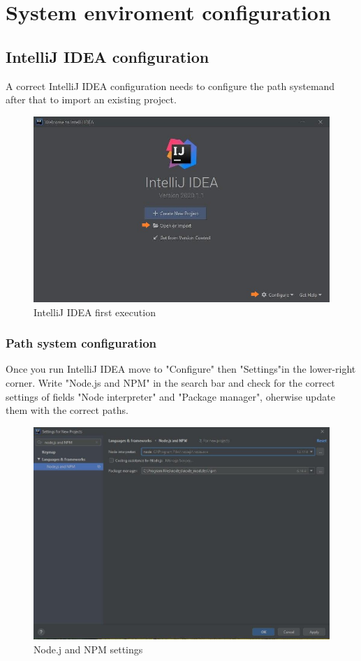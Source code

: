 \section{System enviroment configuration}
	\subsection{IntelliJ IDEA configuration}
A correct IntelliJ IDEA configuration needs to configure the path system\glo and after that to import an existing project.
	
	\begin{figure}[H]
		\centering
		\includegraphics[scale=0.70]{../Developer_manual/img/intellijidea_main.jpg}
		\caption{IntelliJ IDEA first execution}
	\end{figure}	

	

	\subsubsection{Path system configuration}
Once you run IntelliJ IDEA move to "Configure" then "Settings"in the lower-right corner. Write "Node.js and NPM" in the search bar and check for the correct settings of fields "Node interpreter" and "Package manager", oherwise update them with the correct paths. 

\begin{figure}[H]
		\centering
		\includegraphics[scale=0.60]{../Developer_manual/img/nodejs_and_npm.jpg}
		\caption{Node.j and NPM settings}
	\end{figure}	

